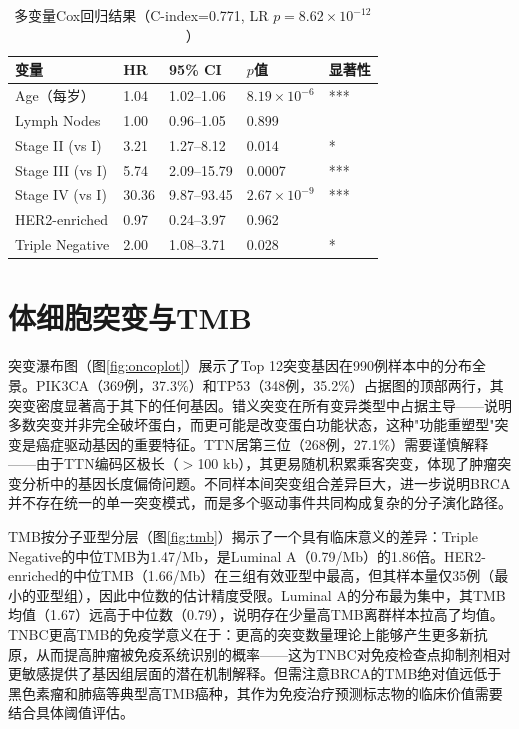 \documentclass[12pt,a4paper,openany]{ctexbook}
\begin{document}
\begin{table}[H]
\centering\caption{多变量Cox回归结果（C-index=0.771, LR $p=8.62\times10^{-12}$）}\label{tab:cox}
\begin{tabular}{lllll}\toprule
变量 & HR & 95\% CI & $p$值 & 显著性 \\\midrule
Age（每岁） & 1.04 & 1.02--1.06 & $8.19\times10^{-6}$ & *** \\
Lymph Nodes & 1.00 & 0.96--1.05 & 0.899 & \\
Stage II (vs I) & 3.21 & 1.27--8.12 & 0.014 & * \\
Stage III (vs I) & 5.74 & 2.09--15.79 & 0.0007 & *** \\
Stage IV (vs I) & 30.36 & 9.87--93.45 & $2.67\times10^{-9}$ & *** \\
HER2-enriched & 0.97 & 0.24--3.97 & 0.962 & \\
Triple Negative & 2.00 & 1.08--3.71 & 0.028 & * \\\bottomrule
\end{tabular}
\end{table}

\section{体细胞突变与TMB}
突变瀑布图（图\ref{fig:oncoplot}）展示了Top 12突变基因在990例样本中的分布全景。PIK3CA（369例，37.3\%）和TP53（348例，35.2\%）占据图的顶部两行，其突变密度显著高于其下的任何基因。错义突变在所有变异类型中占据主导——说明多数突变并非完全破坏蛋白，而更可能是改变蛋白功能状态，这种"功能重塑型"突变是癌症驱动基因的重要特征。TTN居第三位（268例，27.1\%）需要谨慎解释——由于TTN编码区极长（$>$100 kb），其更易随机积累乘客突变，体现了肿瘤突变分析中的基因长度偏倚问题。不同样本间突变组合差异巨大，进一步说明BRCA并不存在统一的单一突变模式，而是多个驱动事件共同构成复杂的分子演化路径。

TMB按分子亚型分层（图\ref{fig:tmb}）揭示了一个具有临床意义的差异：Triple Negative的中位TMB为1.47/Mb，是Luminal A（0.79/Mb）的1.86倍。HER2-enriched的中位TMB（1.66/Mb）在三组有效亚型中最高，但其样本量仅35例（最小的亚型组），因此中位数的估计精度受限。Luminal A的分布最为集中，其TMB均值（1.67）远高于中位数（0.79），说明存在少量高TMB离群样本拉高了均值。TNBC更高TMB的免疫学意义在于：更高的突变数量理论上能够产生更多新抗原，从而提高肿瘤被免疫系统识别的概率——这为TNBC对免疫检查点抑制剂相对更敏感提供了基因组层面的潜在机制解释。但需注意BRCA的TMB绝对值远低于黑色素瘤和肺癌等典型高TMB癌种，其作为免疫治疗预测标志物的临床价值需要结合具体阈值评估。
\end{document}
